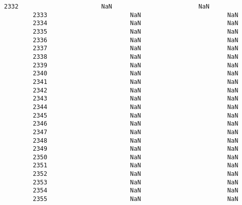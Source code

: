 \documentclass[11pt]{article}
\begin{document}
\begin{Verbatim}[commandchars=\\\{\}]
        2332                       NaN                        NaN   
        2333                       NaN                        NaN   
        2334                       NaN                        NaN   
        2335                       NaN                        NaN   
        2336                       NaN                        NaN   
        2337                       NaN                        NaN   
        2338                       NaN                        NaN   
        2339                       NaN                        NaN   
        2340                       NaN                        NaN   
        2341                       NaN                        NaN   
        2342                       NaN                        NaN   
        2343                       NaN                        NaN   
        2344                       NaN                        NaN   
        2345                       NaN                        NaN   
        2346                       NaN                        NaN   
        2347                       NaN                        NaN   
        2348                       NaN                        NaN   
        2349                       NaN                        NaN   
        2350                       NaN                        NaN   
        2351                       NaN                        NaN   
        2352                       NaN                        NaN   
        2353                       NaN                        NaN   
        2354                       NaN                        NaN   
        2355                       NaN                        NaN   
        

\end{Verbatim}
\end{document}
